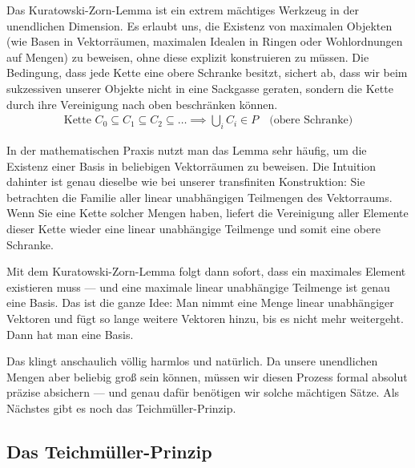 \begin{didactic-insight}
Das Kuratowski-Zorn-Lemma ist ein extrem mächtiges Werkzeug in der unendlichen Dimension. Es erlaubt uns, die Existenz von maximalen Objekten (wie Basen in Vektorräumen, maximalen Idealen in Ringen oder Wohlordnungen auf Mengen) zu beweisen, ohne diese explizit konstruieren zu müssen. Die Bedingung, dass jede Kette eine obere Schranke besitzt, sichert ab, dass wir beim sukzessiven  unserer Objekte nicht in eine Sackgasse geraten, sondern die Kette durch ihre Vereinigung nach oben beschränken können.
\begin{align*}
  \text{Kette } C_0 \subseteq C_1 \subseteq C_2 \subseteq \dots \implies \bigcup_{i} C_i \in P \quad \text{(obere Schranke)}
\end{align*}
\end{didactic-insight}

\begin{spoken-clean}[01:04:13 - 01:06:34]
In der mathematischen Praxis nutzt man das Lemma sehr häufig, um die Existenz einer Basis in beliebigen Vektorräumen zu beweisen. Die Intuition dahinter ist genau dieselbe wie bei unserer transfiniten Konstruktion: Sie betrachten die Familie aller linear unabhängigen Teilmengen des Vektorraums. Wenn Sie eine Kette solcher Mengen haben, liefert die Vereinigung aller Elemente dieser Kette wieder eine linear unabhängige Teilmenge und somit eine obere Schranke.

Mit dem Kuratowski-Zorn-Lemma folgt dann sofort, dass ein maximales Element existieren muss --- und eine maximale linear unabhängige Teilmenge ist genau eine Basis. Das ist die ganze Idee: Man nimmt eine Menge linear unabhängiger Vektoren und fügt so lange weitere Vektoren hinzu, bis es nicht mehr weitergeht. Dann hat man eine Basis.

Das klingt anschaulich völlig harmlos und natürlich. Da unsere unendlichen Mengen aber beliebig groß sein können, müssen wir diesen Prozess formal absolut präzise absichern --- und genau dafür benötigen wir solche mächtigen Sätze. Als Nächstes gibt es noch das Teichmüller-Prinzip.
\end{spoken-clean}

\subsection{Das Teichmüller-Prinzip}

